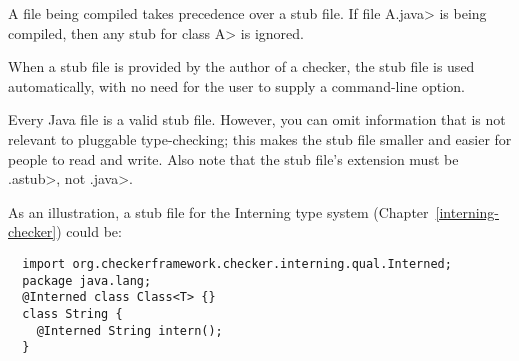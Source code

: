 A file being compiled takes precedence over a stub file.  If file \<A.java>
is being compiled, then any stub for class \<A> is ignored.

When a stub file is provided by the author of a checker, the stub file is used
automatically, with no need for the user to supply a command-line option.



Every Java file is a valid stub file.  However, you can omit information
that is not relevant to pluggable type-checking; this makes the stub file
smaller and easier for people to read and write.
Also note that the stub file's extension must be \<.astub>, not \<.java>.

As an illustration, a stub file for the Interning type system
(Chapter~\ref{interning-checker}) could be:

\begin{Verbatim}
  import org.checkerframework.checker.interning.qual.Interned;
  package java.lang;
  @Interned class Class<T> {}
  class String {
    @Interned String intern();
  }
\end{Verbatim}

